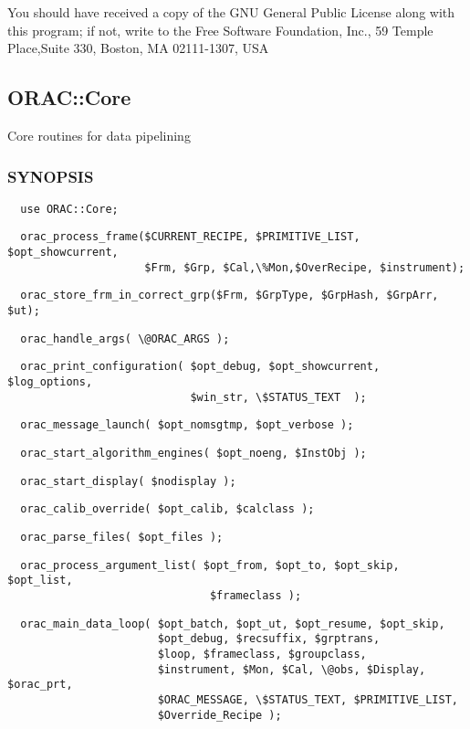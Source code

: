 You should have received a copy of the GNU General Public License along with
this program; if not, write to the Free Software Foundation, Inc., 59 Temple
Place,Suite 330, Boston, MA  02111-1307, USA

\subsection{ORAC::Core\label{ORAC::Core}}


Core routines for data pipelining

\subsubsection*{SYNOPSIS\label{ORAC::Core_SYNOPSIS}}
\begin{verbatim}
  use ORAC::Core;
\end{verbatim}
\begin{verbatim}
  orac_process_frame($CURRENT_RECIPE, $PRIMITIVE_LIST, $opt_showcurrent,
                     $Frm, $Grp, $Cal,\%Mon,$OverRecipe, $instrument);
\end{verbatim}
\begin{verbatim}
  orac_store_frm_in_correct_grp($Frm, $GrpType, $GrpHash, $GrpArr, $ut);
\end{verbatim}
\begin{verbatim}
  orac_handle_args( \@ORAC_ARGS );
\end{verbatim}
\begin{verbatim}
  orac_print_configuration( $opt_debug, $opt_showcurrent, $log_options,
                            $win_str, \$STATUS_TEXT  );
\end{verbatim}
\begin{verbatim}
  orac_message_launch( $opt_nomsgtmp, $opt_verbose );
\end{verbatim}
\begin{verbatim}
  orac_start_algorithm_engines( $opt_noeng, $InstObj );
\end{verbatim}
\begin{verbatim}
  orac_start_display( $nodisplay );
\end{verbatim}
\begin{verbatim}
  orac_calib_override( $opt_calib, $calclass );
\end{verbatim}
\begin{verbatim}
  orac_parse_files( $opt_files );
\end{verbatim}
\begin{verbatim}
  orac_process_argument_list( $opt_from, $opt_to, $opt_skip, $opt_list,
                               $frameclass );
\end{verbatim}
\begin{verbatim}
  orac_main_data_loop( $opt_batch, $opt_ut, $opt_resume, $opt_skip,
                       $opt_debug, $recsuffix, $grptrans,
                       $loop, $frameclass, $groupclass,
                       $instrument, $Mon, $Cal, \@obs, $Display, $orac_prt,
                       $ORAC_MESSAGE, \$STATUS_TEXT, $PRIMITIVE_LIST,
                       $Override_Recipe );
\end{verbatim}

